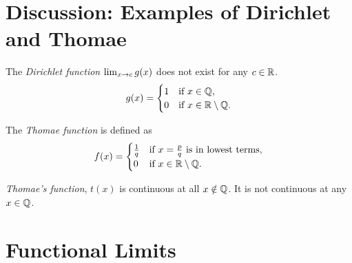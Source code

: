 \section{Discussion: Examples of Dirichlet and Thomae}

\begin{definition}
    The \textit{Dirichlet function} \(\lim_{x \rightarrow c}g(x)\) does not exist for any \(c \in \mathbb{R}\). 
    \[
        g(x) = \begin{cases}
            1 & \text{if } x \in \mathbb{Q}, \\
            0 & \text{if } x \in \mathbb{R} \setminus \mathbb{Q}.
        \end{cases}
    \]
\end{definition}
\begin{center}

\end{center}

\begin{definition}
    The \textit{Thomae function} is defined as 
    \[
        f(x) = \begin{cases}
            \frac{1}{q} & \text{if } x = \frac{p}{q} \text{ is in lowest terms}, \\
            0 & \text{if } x \in \mathbb{R} \setminus \mathbb{Q}.
        \end{cases}
    \]
\end{definition}

\textit{Thomae's function}, \(t(x)\) is continuous at all \(x \notin \mathbb{Q}\). It is not continuous at any \(x \in \mathbb{Q}\).

\newpage

\section{Functional Limits}

